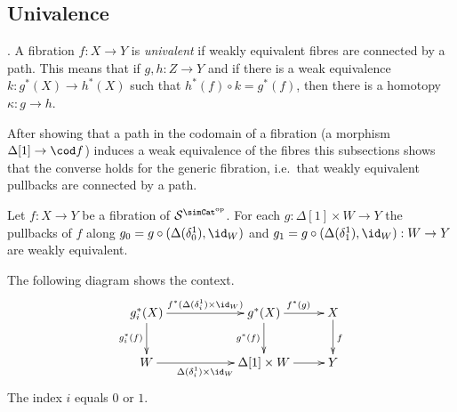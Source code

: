 \documentclass{tac}
\newcommand\hide[1]{}
\newcommand\cat\mathcal
\newcommand\ri{^*}
\newcommand\dual{^{\mathrm{op}}}
\newcommand\s{^{\simCat\dual}}
\newcommand\of{:}
\newcommand\simplex\Delta
\begin{document}
\subsection{Univalence}
\hide{some text?}

\begin{definition}[Univalence]. A fibration $f\of X\to Y$ is \emph{univalent} if weakly equivalent fibres are connected by a path. This means that if $g,h\of Z\to Y$ and if there is a weak equivalence $k\of g\ri(X)\to h\ri(X)$ such that $h\ri(f)\circ k = g\ri(f)$, then there is a homotopy $\kappa\of g\to h$.
\end{definition}

After showing that a path in the codomain of a fibration (a morphism $\simplex[1]\to\cod f$) induces a weak equivalence of the fibres this subsections shows that the converse holds for the generic fibration, i.e.\ that weakly equivalent pullbacks are connected by a path.

\begin{lemma} Let $f\of X\to Y$ be a fibration of $\cat S\s$. For each $g\of \simplex[1]\times W\to Y$ the pullbacks of $f$ along $g_0=g\circ (\simplex(\delta^1_0),\id_W)$ and $g_1=g\circ(\simplex(\delta^1_1),\id_W)\of W\to Y$ are weakly equivalent. \end{lemma}

The following diagram shows the context.
\[\xymatrix{
 g_i\ri(X) \ar[rr]^{f\ri(\simplex(\delta^1_i)\times \id_W)} \ar[d]_{g_i\ri(f)}  && g\ri(X) \ar[r]^{f\ri(g)} \ar[d]_{g\ri(f)}  & X\ar[d]^f\\
 W \ar[rr]_{\simplex(\delta^1_i)\times \id_W} && \simplex[1]\times W \ar[r] & Y\\
}\]
The index $i$ equals $0$ or $1$. 
\end{document}
